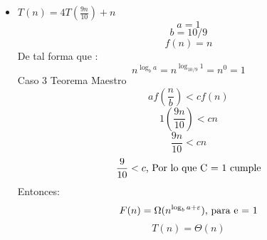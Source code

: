 \documentclass[10pt,a4paper]{article}
\begin{document}
\begin{itemize}
		\item $T(n) = 4T(\frac{9n}{10})+n$
			\begin{equation*}
				a = 1
			\end{equation*}
			\begin{equation*}
				b = 10/9
			\end{equation*}
			\begin{equation*}
				f(n) = n
			\end{equation*}
			De tal forma que :
			\begin{equation*}
				n^{\log_{b}{a}} = n^{\log_{10/9}{1}} = n^{0} = 1
			\end{equation*}
			Caso 3 Teorema Maestro
			\begin{equation*}
				af(\frac{n}{b}) < c f(n)
			\end{equation*}
			\begin{equation*}
				1(\frac{9n}{10}) < cn
			\end{equation*}
			\begin{equation*}
				\frac{9n}{10} < cn
			\end{equation*}
			\begin{equation*}
				\frac{9}{10} < c \textup{, Por lo que C = 1 cumple}
			\end{equation*}
			Entonces:
			\begin{equation*}
				F(n) = \Omega (n^{\log_{b}{a}+\varepsilon})  \textup{, para e = 1}
			\end{equation*}
			\begin{equation*}
				T(n) = \Theta(n)
			\end{equation*}
			

\end{itemize}
\end{document}
